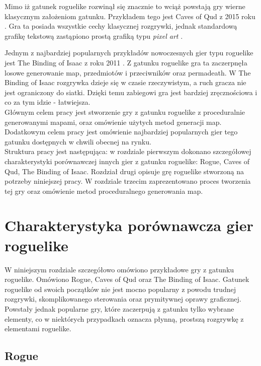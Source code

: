 \documentclass[12pt,twoside]{article}
\begin{document}
Mimo iż gatunek roguelike rozwinął się znacznie to wciąż powstają gry wierne klasycznym założeniom gatunku. Przykładem tego jest Caves of Qud z 2015 roku \cite{game_coq}. Gra ta posiada wszystkie cechy klasycznej rozgrywki, jednak standardową grafikę tekstową zastąpiono prostą grafiką typu \emph{pixel art} \cite{source_pixelart}.

Jednym z najbardziej popularnych przykładów nowoczesnych gier typu roguelike jest The Binding of Isaac z roku 2011 \cite{game_tboi}. Z gatunku roguelike gra ta zaczerpnęła losowe generowanie map, przedmiotów i przeciwników oraz permadeath. W The Binding of Isaac rozgrywka dzieje się w czasie rzeczywistym, a ruch gracza nie jest ograniczony do siatki. Dzięki temu zabiegowi gra jest bardziej zręcznościowa i co za tym idzie -  łatwiejsza.\\

Głównym celem pracy jest stworzenie gry z gatunku roguelike z proceduralnie generowanymi mapami, oraz omówienie użytych metod generacji map. Dodatkowym celem pracy jest omówienie najbardziej popularnych gier tego gatunku dostępnych w chwili obecnej na rynku. \\

Struktura pracy jest następująca: w rozdziale pierwszym dokonano szczegółowej charakterystyki porównawczej innych gier z gatunku roguelike: Rogue, Caves of Qud, The Binding of Isaac. Rozdział drugi opisuje grę roguelike stworzoną na potrzeby niniejszej pracy. W rozdziale trzecim zaprezentowano proces tworzenia tej gry oraz omówienie metod proceduralnego generowania map.


\clearpage

\section{Charakterystyka porównawcza gier roguelike}

W niniejszym rozdziale szczegółowo omówiono przykładowe gry z gatunku roguelike. Omówiono Rogue, Caves of Qud oraz The Binding of Isaac. Gatunek roguelike od swoich początków nie jest mocno popularny z powodu trudnej rozgrywki, skomplikowanego sterowania oraz prymitywnej oprawy graficznej. Powstały jednak popularne gry, które zaczerpują z gatunku tylko wybrane elementy, co w niektórych przypadkach oznacza płynną, prostszą rozgrywkę z elementami roguelike.

\subsection{Rogue}
\end{document}
